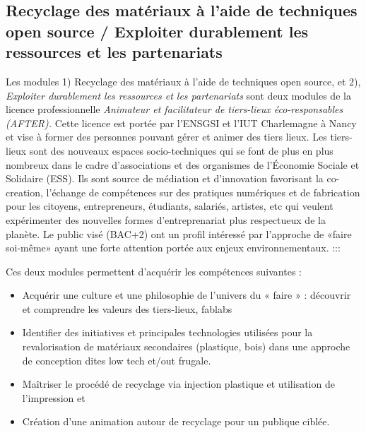 \documentclass[
  11pt,
]{article}
\providecommand{\tightlist}{%
  \setlength{\itemsep}{0pt}\setlength{\parskip}{0pt}}\usepackage{longtable,booktabs,array}
\begin{document}
\hypertarget{recyclage-des-matuxe9riaux-uxe0-laide-de-techniques-open-source-exploiter-durablement-les-ressources-et-les-partenariats}{%
\subsection{Recyclage des matériaux à l'aide de techniques open source /
Exploiter durablement les ressources et les
partenariats}\label{recyclage-des-matuxe9riaux-uxe0-laide-de-techniques-open-source-exploiter-durablement-les-ressources-et-les-partenariats}}

Les modules 1) Recyclage des matériaux à l'aide de techniques open
source, et 2), \emph{Exploiter durablement les ressources et les
partenariats} sont deux modules de la licence professionnelle
\emph{Animateur et facilitateur de tiers-lieux éco-responsables
(AFTER).} Cette licence est portée par l'ENSGSI et l'IUT Charlemagne à
Nancy et vise à former des personnes pouvant gérer et animer des tiers
lieux. Les tiers-lieux sont des nouveaux espaces socio-techniques qui se
font de plus en plus nombreux dans le cadre d'associations et des
organismes de l'Économie Sociale et Solidaire (ESS). Ils sont source de
médiation et d'innovation favorisant la co-creation, l'échange de
compétences sur des pratiques numériques et de fabrication pour les
citoyens, entrepreneurs, étudiants, salariés, artistes, etc qui veulent
expérimenter des nouvelles formes d'entreprenariat plus respectueux de
la planète. Le public visé (BAC+2) ont un profil intéressé par
l'approche de «faire soi-même» ayant une forte attention portée aux
enjeux environnementaux. :::

Ces deux modules permettent d'acquérir les compétences suivantes :

\begin{itemize}
\tightlist
\item
  Acquérir une culture et une philosophie de l'univers du « faire » :
  découvrir et comprendre les valeurs des tiers-lieux, fablabs
\item
  Identifier des initiatives et principales technologies utilisées pour
  la revalorisation de matériaux secondaires (plastique, bois) dans une
  approche de conception dites low tech et/out frugale.
\item
  Maîtriser le procédé de recyclage via injection plastique et
  utilisation de l'impression et
\item
  Création d'une animation autour de recyclage pour un publique ciblée.
\end{itemize}
\end{document}
